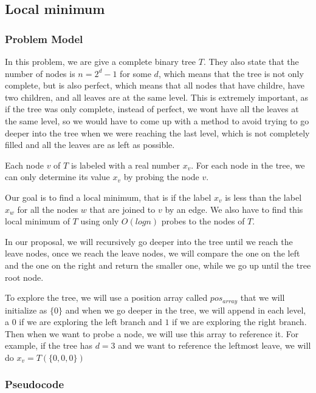 \documentclass{article}
\begin{document}
\subsection*{Local minimum}

\subsubsection*{Problem Model}

In this problem, we are give a complete binary tree $T$. They also state that the number of nodes is $n = 2^d -1$ for some $d$, which means that the tree is not only complete, but is also perfect, which means that all nodes that have childre, have two children, and all leaves are at the same level. This is extremely important, as if the tree was only complete, instead of perfect, we wont have all the leaves at the same level, so we would have to come up with a method to avoid trying to go deeper into the tree when we were reaching the last level, which is not completely filled and all the leaves are as left as possible.


Each node $v$ of $T$ is labeled with a real number $x_v$. For each node in the tree, we can only determine its value $x_v$ by probing the node $v$.

Our goal is to find a local minimum, that is if the label $x_v$ is less than the label $x_w$ for all the nodes $w$ that are joined to $v$ by an edge.  We also have to find this local minimum of $T$ using only $O(log n)$ probes to the nodes of $T$.

In our proposal, we will recursively go deeper into the tree until we reach the leave nodes, once we reach the leave nodes, we will compare the one on the left and the one on the right and return the smaller one, while we go up until the tree root node.

To explore the tree, we will use a position array called $pos_{array}$ that we will initialize as $\{0\}$ and when we go deeper in the tree, we will append in each level, a $0$ if we are exploring the left branch and $1$ if we are exploring the right branch. Then when we want to probe a node, we will use this array to reference it. For example, if the tree has $d = 3$ and we want to reference the leftmost leave, we will do $x_{v} = T(\{0,0,0\})$

\subsubsection*{Pseudocode}
\end{document}
